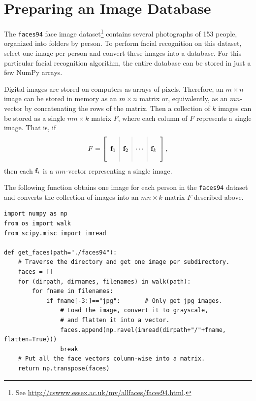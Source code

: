 \label{lab:FacialRecognition}


\section*{Preparing an Image Database} %

The \texttt{faces94} face image dataset\footnote{See \url{http://cswww.essex.ac.uk/mv/allfaces/faces94.html}.} contains several photographs of 153 people, organized into folders by person.
To perform facial recognition on this dataset, select one image per person and convert these images into a database.
For this particular facial recognition algorithm, the entire database can be stored in just a few NumPy arrays.

Digital images are stored on computers as arrays of pixels.
Therefore, an $m \times n$ image can be stored in memory as an $m\times n$ matrix or, equivalently, as an $mn$-vector by concatenating the rows of the matrix.
Then a collection of $k$ images can be stored as a single $mn\times k$ matrix $F$, where each column of $F$ represents a single image.
That is, if
\[
F = \left[\begin{array}{c|c|c|c}
\arrayrulecolor{lightgray}
& & & \\
\f_1 & \f_2 & \cdots & \f_k
\\
& & &
\end{array}\right],
\]
then each $\mathbf{f}_i$ is a $mn$-vector representing a single image.

The following function obtains one image for each person in the \texttt{faces94} dataset and converts the collection of images into an $mn \times k$ matrix $F$ described above.

\begin{lstlisting}
import numpy as np
from os import walk
from scipy.misc import imread

def get_faces(path="./faces94"):
    # Traverse the directory and get one image per subdirectory.
    faces = []
    for (dirpath, dirnames, filenames) in walk(path):
        for fname in filenames:
            if fname[-3:]=="jpg":       # Only get jpg images.
                # Load the image, convert it to grayscale,
                # and flatten it into a vector.
                faces.append(np.ravel(imread(dirpath+"/"+fname, flatten=True)))
                break
    # Put all the face vectors column-wise into a matrix.
    return np.transpose(faces)
\end{lstlisting}

